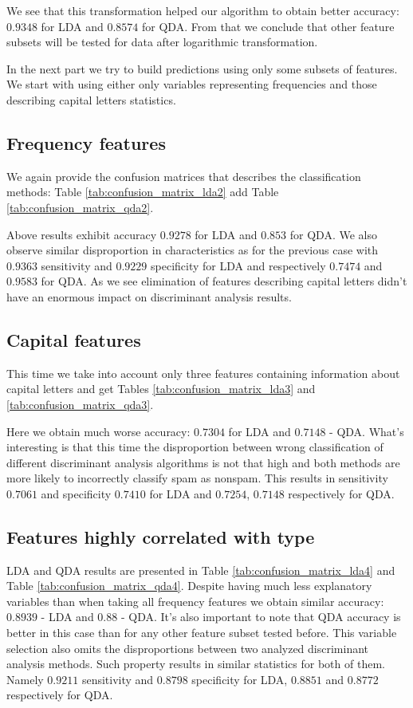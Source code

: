 \documentclass{article}\usepackage[]{graphicx}\usepackage[]{xcolor}
\begin{document}
We see that this transformation helped our algorithm to obtain better accuracy: 
$0.9348$ for LDA and $0.8574$ for QDA. From that we conclude that other feature 
subsets will be tested for data after logarithmic transformation.

In the next part we try to build predictions using only some subsets of features. 
We start with using either only variables representing frequencies and those describing capital letters statistics.

\subsection*{Frequency features}

We again provide the confusion matrices that describes the classification methods: 
Table \ref{tab:confusion_matrix_lda2} add Table \ref{tab:confusion_matrix_qda2}.
	
Above results exhibit accuracy $0.9278$ for LDA and $0.853$ for QDA. We also 
observe similar disproportion in characteristics as for the previous case with 
$0.9363$ sensitivity and $0.9229$ specificity for LDA and respectively $0.7474$ 
and $0.9583$ for QDA. As we see elimination of features describing capital letters 
didn't have an enormous impact on discriminant analysis results.

\subsection*{Capital features}

This time we take into account only three features containing information about capital 
letters and get Tables \ref{tab:confusion_matrix_lda3} and \ref{tab:confusion_matrix_qda3}.
	 
Here we obtain much worse accuracy: $0.7304$ for LDA and $0.7148$ - QDA. What's 
interesting is that this time the disproportion between wrong classification of 
different discriminant analysis algorithms is not that high and both methods are 
more likely to incorrectly classify spam as nonspam. This results in sensitivity 
$0.7061$ and specificity $0.7410$ for LDA and $0.7254$, $0.7148$ respectively for QDA.

\subsection*{Features highly correlated with type}
	 
LDA and QDA results are presented in Table \ref{tab:confusion_matrix_lda4} 
and Table \ref{tab:confusion_matrix_qda4}.
Despite having much less explanatory variables than when taking all frequency 
features we obtain similar accuracy: $0.8939$ - LDA and $0.88$ - QDA. It's also 
important to note that QDA accuracy is better in this case than for any other 
feature subset tested before. This variable selection also omits the disproportions 
between two analyzed discriminant analysis methods. Such property results in similar 
statistics for both of them. Namely $0.9211$ sensitivity and $0.8798$ specificity 
for LDA,  $0.8851$ and $0.8772$ respectively for QDA.
	 
\end{document}
